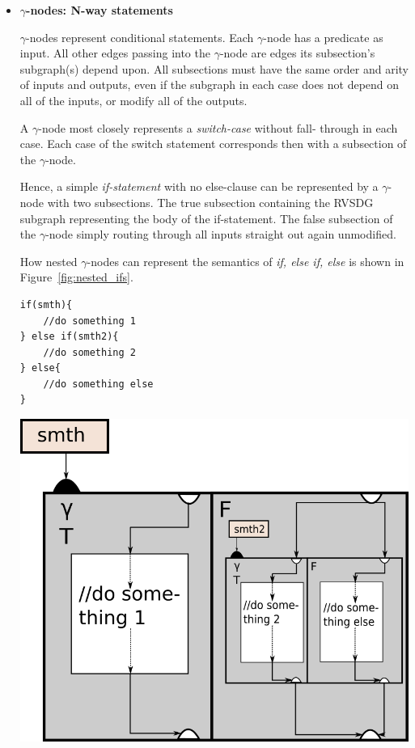\begin{itemize}

\item \textbf{$\gamma$-nodes: N-way statements}

\textit{$\gamma$}-nodes represent conditional statements. Each $\gamma$-node has
a predicate as input. All other edges passing into the $\gamma$-node are edges
its subsection's subgraph(s) depend upon. All subsections must have the same
order and arity of inputs and outputs, even if the subgraph in each case does
not depend on all of the inputs, or modify all of the outputs.

A $\gamma$-node most closely represents a \textit{switch-case} without fall-
through in each case. Each case of the switch statement corresponds then with a
subsection of the $\gamma$-node.

Hence, a simple \textit{if-statement} with no else-clause can be represented by
a $\gamma$-node with two subsections. The true subsection containing the RVSDG
subgraph representing the body of the if-statement. The false subsection of the
$\gamma$-node simply routing through all inputs straight out again unmodified.

How nested $\gamma$-nodes can represent the semantics of \textit{if, else if,
else} is shown in Figure~\ref{fig:nested_ifs}.

\begin{centering}
	\noindent\begin{minipage}{0.36\textwidth}
		\begin{lstlisting}[label={lst:nested_ifs}, style=customcpp]
if(smth){
	//do something 1
} else if(smth2){
	//do something 2
} else{
	//do something else
}
		\end{lstlisting}
	\end{minipage}
	\noindent\begin{minipage}{0.55\textwidth}
		\captionsetup{type=figure}
		\includegraphics[width=\textwidth]{figures/if_elseif_else_example}
	\end{minipage}
	\label{fig:nested_ifs}
\end{centering}


\end{itemize}
